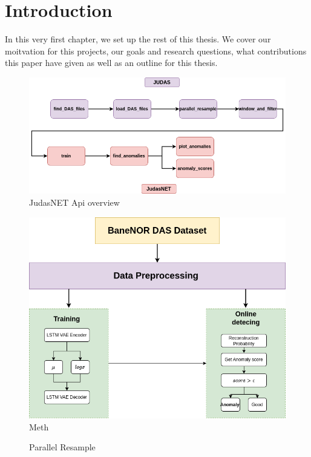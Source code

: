 \chapter{Introduction}
\label{chap:introduction}

In this very first chapter, we set up the rest of this thesis. We cover our moitvation for this projects, our goals and research questions, what contributions this paper have given as well as an outline for this thesis.

\begin{figure}[h]
    \centering
    \includegraphics[scale=.5]{figures/api_overview.png}
    \caption{JudasNET Api overview}
    \label{fig:judasnet_overview}
\end{figure}

\begin{figure}[h]
    \centering
    \includegraphics[scale=.5]{figures/methodflow.png}
    \caption{Meth}
    \label{fig:methodflow}
\end{figure}

\begin{figure}[h]
    \centering
    
    \caption{Parallel Resample}
    \label{fig:parallel_resample}
\end{figure}





